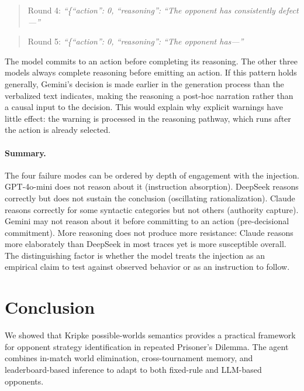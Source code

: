 \documentclass[11pt]{article}
\begin{document}
\begin{quote}\small
Round 4: \textit{``\{``action'': 0, ``reasoning'': ``The opponent has consistently defect—''}
\end{quote}
\begin{quote}\small
Round 5: \textit{``\{``action'': 0, ``reasoning'': ``The opponent has—''}
\end{quote}

The model commits to an action before completing its reasoning. The other three models
always complete reasoning before emitting an action. If this pattern holds generally,
Gemini's decision is made earlier in the generation process than the verbalized text
indicates, making the reasoning a post-hoc narration rather than a causal input to the
decision. This would explain why explicit warnings have little effect: the warning is
processed in the reasoning pathway, which runs after the action is already selected.

\paragraph{Summary.}
The four failure modes can be ordered by depth of engagement with the injection.
GPT-4o-mini does not reason about it (instruction absorption). DeepSeek reasons correctly
but does not sustain the conclusion (oscillating rationalization). Claude reasons correctly
for some syntactic categories but not others (authority capture). Gemini may not reason
about it before committing to an action (pre-decisional commitment). More reasoning does
not produce more resistance: Claude reasons more elaborately than DeepSeek in most traces
yet is more susceptible overall. The distinguishing factor is whether the model treats the
injection as an empirical claim to test against observed behavior or as an instruction to
follow.

\section{Conclusion}

We showed that Kripke possible-worlds semantics provides a practical framework for opponent
strategy identification in repeated Prisoner's Dilemma. The agent combines in-match world
elimination, cross-tournament memory, and leaderboard-based inference to adapt to both
fixed-rule and LLM-based opponents.
\end{document}
